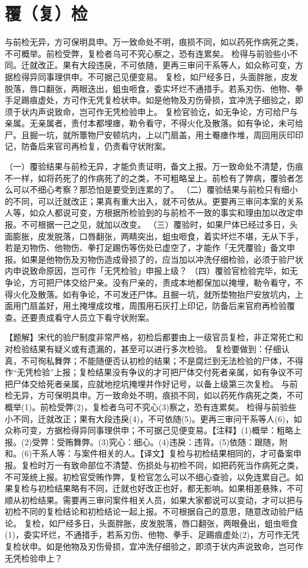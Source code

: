 \documentclass[12pt,UTF8]{ctexbook}
\begin{document}
\chapter{覆（复）检}

与前检无异，方可保明具申。万一致命处不明，痕损不同，如以药死作病死之类，不可概举。前检受弊，复检者乌可不究心察之，恐有连累矣。
检得与前验些小不同。迁就改正。果有大段违戾，不可依随，更再三审问干系等人，如众称可变，方据检得异同事理供申。不可据己见便变易。
复检，如尸经多日，头面胖胀，皮发脱落，唇口翻张，两眼迭出，蛆虫咂食，委实坏烂不通措手。若系刃伤、他物、拳手足踢痕虚处，方可作无凭复检状申。如是他物及刃伤骨损，宜冲洗子细验之，即须于状内声说致命，岂可作无凭检验申上。
复检官验讫，如无争论，方可给尸与亲属。无亲属者，责付本都埋瘗，勒令看守，不得火化及散落。如有争论，未可给尸。且掘一坑，就所簟物尸安顿坑内，上以门扇盖，用土罨瘗作堆，周回用灰印印记，防备后来官司再检复，仍责看守状附案。


（一）覆验结果与前检无异，才能负责证明，备文上报。万一致命处不清楚，伤痕不一样，如将药死了的作病死了的之类，不可粗略呈上。前检有了弊病，覆验者怎么可以不细心考察？那恐怕是要受到连累的了。
（二）覆验结果与前检只有细小的不同，可以迁就改正；果真有重大出入，就不可依从。更要再三审问本案的关系人等，如众人都说可变，方根据所检验到的与前检不一致的事实和理由加以改定申报。不可根据一己之见，就加以改变。
（三）覆验时，如果尸体已经过多日，头面膨胀，皮发脱落，口唇翻张，两睛突出，蛆虫咂食，着实坏烂不堪，无从下手，若是刃物伤、他物伤、拳打足踢伤等伤处已虚空了，才能作「无凭覆验」备文申报。如果是他物伤及刃物伤造成骨损了的，应当加以冲洗仔细检验，必须于验尸状内申说致命原因，岂可作「无凭检验」申报上级？
（四）覆验官检验完毕，如无争论，方可把尸体交给尸亲。没有尸亲的，责成本地都保加以掩埋，勒令看守，不得火化及散落。如有争论，不可发还尸体。且掘一坑，就所垫物抬尸安放坑内，上面用门扇盖好，用土掩埋成坟堆，周围用石灰打上印记，防备后来官府再检验覆查。还要责成看守人员立下看守状附案。

【题解】宋代的验尸制度非常严格，初检后都要由上一级官员复检，非正常死亡和对检验结果有疑义或有遗漏的，甚至可以进行多次检验。
复检要做到：仔细认真，不可徇私舞弊；不能随便否认初检的结果；不是腐烂到无法检验的尸体，不得作“无凭检验”上报；复检结果没有争议的才可把尸体交付死者亲属，如有争议不可把尸体交给死者亲属，应就地挖坑掩埋并作好记号，以备上级第三次复检。
与前检无异，方可保明具申。万一致命处不明，痕损不同，如以药死作病死之类，不可概举(1)。前检受弊(2)，复检者乌可不究心(3)察之，恐有连累矣。
检得与前验些小不同，迁就改正；果有大段违戾(4)，不可依随(5)。更再三审问干系等人(6)，如众称可变，方据检得异同事理供申；不可据己见便变易。【注释】(1)概举：粗略上报。(2)受弊：受贿舞弊。(3)究心：细心。(4)违戾：违背。(5)依随：跟随，附和。(6)干系人等：与案件相关的人。【译文】复检与初检结果相同的，才可备案申报。复检时万一有致命部位不清楚、伤损处与初检不同，如把药死当作病死之类，不可笼统上报。初检官受贿作弊，复检官怎么可以不细心查验，以免连累自己。如果复检与初检结果略有不同，迁就也好改正也好，都无影响。如果相差悬殊，不可顺从初检结果。需要再三审问案件相关人员，如果大家都说可以变动，才可以把与初检不同的复检结论和初检结论一起上报。不可根据自己的意思，随意改动验尸结论。
复检，如尸经多日，头面胖胀，皮发脱落，唇口翻张，两眼叠出，蛆虫咂食(1)，委实坏烂，不通措手，若系刃伤、他物、拳手、足踢痕虚处(2)，方可作无凭复检状申。如是他物及刃伤骨损，宜冲洗仔细验之，即须于状内声说致命，岂可作无凭检验申上？
\end{document}
